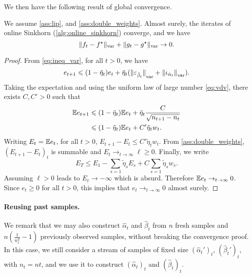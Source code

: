 We then have the following result of global convergence.

\begin{proposition}\label{prop:convergence_true}
    We assume \autoref{ass:lip}, and
    \ref{ass:double_weights}. Almost surely, the iterates of online Sinkhorn
    (\autoref{alg:online_sinkhorn}) converge, and we have
    \begin{equation}
        \Vert f_t - f^\star \Vert_{\text{var}} + \Vert g_t - g^\star \Vert_{\text{var}} \to 0.
    \end{equation}
\end{proposition}


\begin{proof}
From \eqref{eq:ineq_var}, for all $t > 0$, we have
\begin{equation}
    e_{t+1} \leqslant 
    (1 - \tilde \eta_t) e_t
    + \tilde \eta_t
    ({\Vert \varepsilon_{\hat \beta_t} \Vert}_{\text{var}} + 
    {\Vert \iota_{\hat \alpha_t} \Vert}_{\text{var}}).
\end{equation}
Taking the expectation and using the uniform law of 
large number \eqref{eq:vdv}, there exists $C, C' > 0$ such that
\begin{align}
    \mathbb{E} e_{t+1} &\leqslant (1 - \tilde \eta_t) \mathbb{E} e_t + \tilde \eta_t \frac{C}{\sqrt{n_{t+1} - n_t}} \\
    &\leqslant (1 - \tilde \eta_t) \mathbb{E} e_t + C' \tilde \eta_t w_t.
\end{align}
Writing $E_t = \mathbb{E} e_t$, for all $t > 0$, $E_{t+1} - E_t \leq C' \tilde \eta_t w_t$. 
From \autoref{ass:double_weights}, ${(E_{t+1} - E_t)}_t$ is summable and $E_t \to_{t
\to \infty} \ell \geq 0$. Finally, we write
\begin{equation}
    E_T \leq E_1 - \sum_{s=1} \tilde \eta_s E_s + C\sum_{s=1} \tilde \eta_s w_s.
\end{equation}
Assuming $\ell > 0$ leads to $E_t \to -\infty$ which is absurd. Therefore $\mathbb{E}
e_t \to_{t \to \infty} 0$. Since $e_t \geq 0$ for all $t > 0$, this implies that
$e_t \to_{t \to \infty} 0$ almost surely.
\end{proof}


\paragraph{Reusing past samples.}
We remark that we may also construct $\hat \alpha_t$ and $\hat \beta_t$ from $n$
fresh samples and $n (\frac{1}{w_t^2} - 1)$ previously observed samples,
without breaking the convergence proof. In this case, we still consider a stream
of samples of fixed size $(\hat \alpha_t')_t$, $(\hat \beta_t')_t$, with $n_t =
n t$, and we use it to construct $(\hat \alpha_t)_t$ and $(\hat \beta_t)_t$.

